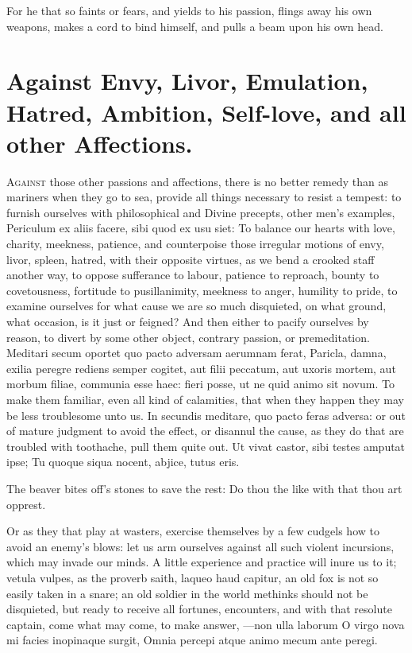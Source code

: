 {For he that so faints or fears, and yields to his passion, flings away
his own weapons, makes a cord to bind himself, and pulls a beam upon
his own head.


\section[Against Envy, Livor, Emulation,\ldots{}]{Against Envy, Livor, Emulation, Hatred, Ambition, Self-love, and all other Affections.}

\lettrine{A}{gainst} those other passions and affections, there is no better
remedy than as mariners when they go to sea, provide all things
necessary to resist a tempest: to furnish ourselves with philosophical
and Divine precepts, other men's examples, Periculum ex aliis
facere, sibi quod ex usu siet: To balance our hearts with love,
charity, meekness, patience, and counterpoise those irregular motions
of envy, livor, spleen, hatred, with their opposite virtues, as we bend
a crooked staff another way, to oppose sufferance to labour,
patience to reproach, bounty to covetousness, fortitude to
pusillanimity, meekness to anger, humility to pride, to examine
ourselves for what cause we are so much disquieted, on what ground,
what occasion, is it just or feigned? And then either to pacify
ourselves by reason, to divert by some other object, contrary passion,
or premeditation. Meditari secum oportet quo pacto adversam
aerumnam ferat, Paricla, damna, exilia peregre rediens semper cogitet,
aut filii peccatum, aut uxoris mortem, aut morbum filiae, communia esse
haec: fieri posse, ut ne quid animo sit novum. To make them familiar,
even all kind of calamities, that when they happen they may be less
troublesome unto us. In secundis meditare, quo pacto feras adversa: or
out of mature judgment to avoid the effect, or disannul the cause, as
they do that are troubled with toothache, pull them quite out.
Ut vivat castor, sibi testes amputat ipse;
Tu quoque siqua nocent, abjice, tutus eris.

The beaver bites off's stones to save the rest:
Do thou the like with that thou art opprest.

Or as they that play at wasters, exercise themselves by a few cudgels
how to avoid an enemy's blows: let us arm ourselves against all such
violent incursions, which may invade our minds. A little experience and
practice will inure us to it; vetula vulpes, as the proverb saith,
laqueo haud capitur, an old fox is not so easily taken in a snare; an
old soldier in the world methinks should not be disquieted, but ready
to receive all fortunes, encounters, and with that resolute captain,
come what may come, to make answer,
---non ulla laborum
O virgo nova mi facies inopinaque surgit,
Omnia percepi atque animo mecum ante peregi.

}
